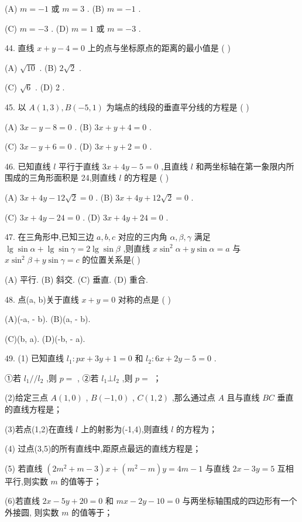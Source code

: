 (A) $m =  - 1$ 或 $m = 3$ . (B) $m =  - 1$ .

(C) $m =  - 3$ . (D) $m = 1$ 或 $m =  - 3$ .

44. 直线 $x + y - 4 = 0$ 上的点与坐标原点的距离的最小值是 (   )

(A) $\sqrt{10}$ . (B) $2\sqrt{2}$ .

(C) $\sqrt{6}$ . (D) 2 .

45. 以 $A\left( {1,3}\right) ,B\left( {-5,1}\right)$ 为端点的线段的垂直平分线的方程是 (   )

(A) ${3x} - y - 8 = 0$ . (B) ${3x} + y + 4 = 0$ .

(C) ${3x} - y + 6 = 0$ . (D) ${3x} + y + 2 = 0$ .

46. 已知直线 $l$ 平行于直线 ${3x} + {4y} - 5 = 0$ ,且直线 $l$ 和两坐标轴在第一象限内所围成的三角形面积是 24,则直线 $l$ 的方程是 (   )

(A) ${3x} + {4y} - {12}\sqrt{2} = 0$ . (B) ${3x} + {4y} + {12}\sqrt{2} = 0$ .

(C) ${3x} + {4y} - {24} = 0$ . (D) ${3x} + {4y} + {24} = 0$ .

47. 在三角形中,已知三边 $a,b,c$ 对应的三内角 $\alpha ,\beta ,\gamma$ 满足 $\lg \sin \alpha  + \lg \sin \gamma  = 2\lg \sin \beta$ ,则直线 $x{\sin }^{2}\alpha  + y\sin \alpha  = a$ 与 $x{\sin }^{2}\beta  + y\sin \gamma  = c$ 的位置关系是(   )

(A) 平行. (B) 斜交. (C) 垂直. (D) 重合.

48. 点(a, b)关于直线 $x + y = 0$ 对称的点是 (   )

(A)(-a, - b). (B)(a, - b).

(C)(b, a). (D)(-b, - a).

49. (1) 已知直线 ${l}_{1} : {px} + {3y} + 1 = 0$ 和 ${l}_{2} : {6x} + {2y} - 5 = 0$ .

①若 ${l}_{1}//{l}_{2}$ ,则 $p =$ \blkda{}, ②若 ${l}_{1} \bot  {l}_{2}$ ,则 $p =$ \blkda{}；

(2)给定三点 $A\left( {1,0}\right)$ , $B\left( {-1,0}\right)$ , $C\left( {1,2}\right)$ ,那么通过点 $A$ 且与直线 ${BC}$ 垂直的直线方程是\blkda{}；

(3)若点(1,2)在直线 $l$ 上的射影为(-1,4),则直线 $l$ 的方程为\blkda{}；

(4) 过点(3,5)的所有直线中,距原点最远的直线方程是\blkda{}；

(5) 若直线 $\left( {2{m}^{2} + m - 3}\right) x + \left( {{m}^{2} - m}\right) y = {4m} - 1$ 与直线 ${2x} - {3y} = 5$ 互相平行,则实数 $m$ 的值等于\blkda{}；

(6)若直线 ${2x} - {5y} + {20} = 0$ 和 ${mx} - {2y} - {10} = 0$ 与两坐标轴围成的四边形有一个外接圆, 则实数 $m$ 的值等于\blkda{}；

